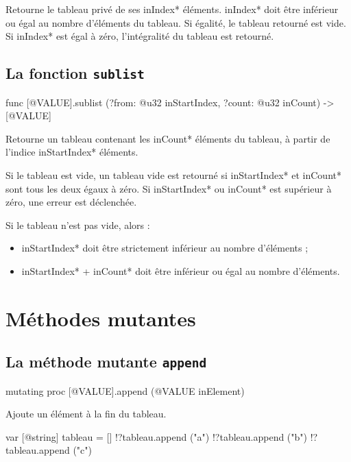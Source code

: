 Retourne le tableau privé de ses \ggsq*inIndex* éléments. \ggsq*inIndex* doit être inférieur ou égal au nombre d'éléments du tableau. Si égalité, le tableau retourné est vide. Si \ggsq*inIndex* est égal à zéro, l'intégralité du tableau est retourné.






\subsection{La fonction \texttt{sublist}}

\begin{galgas4box}
func [@VALUE].sublist (?from: @u32 inStartIndex, ?count: @u32 inCount) -> [@VALUE]
\end{galgas4box}

Retourne un tableau contenant les \ggsq*inCount* éléments du tableau, à partir de l'indice \ggsq*inStartIndex* éléments.

Si le tableau est vide, un tableau vide est retourné si \ggsq*inStartIndex* et \ggsq*inCount* sont tous les deux égaux à zéro. Si \ggsq*inStartIndex* ou \ggsq*inCount* est supérieur à zéro, une erreur est déclenchée.

Si le tableau n'est pas vide, alors :
\begin{itemize}
  \item \ggsq*inStartIndex* doit être strictement inférieur au nombre d'éléments ;
  \item \ggsq*inStartIndex* + \ggsq*inCount* doit être inférieur ou égal au nombre d'éléments.
\end{itemize}




\section{Méthodes mutantes}




\subsection{La méthode mutante \texttt{append}}

\begin{galgas4box}
mutating proc [@VALUE].append (@VALUE inElement)
\end{galgas4box}

Ajoute un élément à la fin du tableau.


\begin{galgas4}
var [@string] tableau = []
!?tableau.append ("a")
!?tableau.append ("b")
!?tableau.append ("c")
\end{galgas4}



